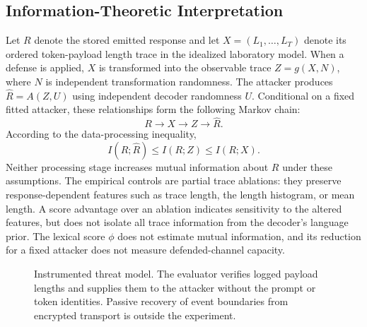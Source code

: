 \documentclass[electronics,article,submit,pdftex,moreauthors]{Definitions/mdpi}
\begin{document}
\subsection{Information-Theoretic Interpretation}
Let $R$ denote the stored emitted response and let $X=(L_1,\ldots,L_T)$ denote its ordered token-payload length trace in the idealized laboratory model. When a defense is applied, $X$ is transformed into the observable trace $Z=g(X,N)$, where $N$ is independent transformation randomness. The attacker produces $\widehat{R}=A(Z,U)$ using independent decoder randomness $U$. Conditional on a fixed fitted attacker, these relationships form the following Markov chain:
\begin{equation}
R \longrightarrow X \longrightarrow Z \longrightarrow \widehat{R}.
\end{equation}
According to the data-processing inequality,
\begin{equation}
I(R;\widehat{R}) \leq I(R;Z) \leq I(R;X).
\end{equation}
Neither processing stage increases mutual information about $R$ under these assumptions. The empirical controls are partial trace ablations: they preserve response-dependent features such as trace length, the length histogram, or mean length. A score advantage over an ablation indicates sensitivity to the altered features, but does not isolate all trace information from the decoder's language prior. The lexical score $\phi$ does not estimate mutual information, and its reduction for a fixed attacker does not measure defended-channel capacity.

\begin{figure}[ht]
\centering
{}
\caption{Instrumented threat model. The evaluator verifies logged payload lengths and supplies them to the attacker without the prompt or token identities. Passive recovery of event boundaries from encrypted transport is outside the experiment.}
\label{fig:threat_model}
\end{figure}
\end{document}
